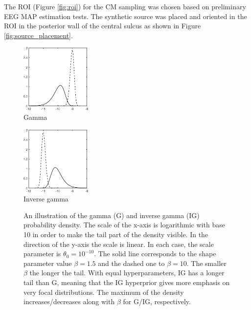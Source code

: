 \documentclass[5p]{elsarticle}
\begin{document}
The ROI (Figure \ref{fig:roi}) for the CM sampling was chosen based on preliminary EEG MAP estimation tests. The synthetic source was placed and oriented in the ROI in the posterior  wall of the central sulcus as shown in Figure \ref{fig:source_placement}.

\begin{figure}[h!]
\begin{footnotesize}
\begin{center}
\begin{minipage}{3.9cm} \begin{center}
\includegraphics[width=3.5cm]{gamma_density.png} \\ Gamma 
\end{center}\end{minipage} 
\begin{minipage}{3.9cm} \begin{center}
\includegraphics[width=3.5cm]{inverse_gamma_density.png} \\ Inverse gamma
\end{center}
\end{minipage} 
\end{center}
\end{footnotesize}
\caption{An illustration of the gamma (G) and inverse gamma (IG) probability density. The scale of the x-axis is logarithmic with base 10 in order to make the tail part of the density visible. In the direction of the y-axis the scale is linear. In each case, the scale parameter is $\theta_0 = 10^{-10}$. The solid line corresponds to the shape parameter value $\beta = 1.5$ and the dashed one to $\beta = 10$. The smaller $\beta$ the longer the tail.  With equal hyperparameters, IG has a longer tail than G, meaning that the IG hyperprior gives more emphasis on very focal distributions. The maximum of the density increases/decreases along with $\beta$ for G/IG, respectively. }
\label{fig:gamma_vs_inverse_gamma} 
\end{figure}
\end{document}
